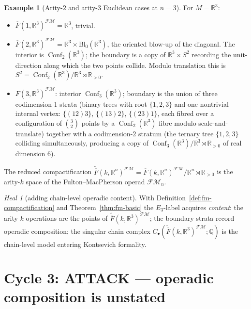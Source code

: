 \documentclass[11pt]{article}
\theoremstyle{definition}
\newtheorem{example}[theorem]{Example}
\theoremstyle{remark}
\newtheorem{heal}[theorem]{Heal}
\DeclareMathOperator{\Conf}{Conf}
\newcommand{\FMbar}{\overline{F}}
\newcommand{\FM}{\mathcal{FM}}
\begin{document}
\begin{example}[Arity-$2$ and arity-$3$ Euclidean cases at $n = 3$]
\label{ex:fm-arity-2-3}
For $M = \mathbb{R}^3$:
\begin{itemize}
 \item $\FMbar(1, \mathbb{R}^3)^{\FM} = \mathbb{R}^3$, trivial.
 \item $\FMbar(2, \mathbb{R}^3)^{\FM} = \mathbb{R}^3 \times
       \mathrm{Bl}_0(\mathbb{R}^3)$, the oriented blow-up of the
       diagonal. The interior is $\Conf_2(\mathbb{R}^3)$; the
       boundary is a copy of $\mathbb{R}^3 \times S^2$ recording the
       unit-direction along which the two points collide. Modulo
       translation this is $S^2 = \Conf_2(\mathbb{R}^3)/\mathbb{R}^3
       \rtimes \mathbb{R}_{>0}$.
 \item $\FMbar(3, \mathbb{R}^3)^{\FM}$: interior
       $\Conf_3(\mathbb{R}^3)$; boundary is the union of three
       codimension-$1$ strata (binary trees with root $\{1,2,3\}$ and
       one nontrivial internal vertex: $\{(12)3\}$, $\{(13)2\}$,
       $\{(23)1\}$, each fibred over a configuration of
       $\binom{3}{2}$ points by a $\Conf_2(\mathbb{R}^3)$ fibre modulo
       scale-and-translate) together with a codimension-$2$ stratum
       (the ternary tree $\{1, 2, 3\}$ colliding simultaneously,
       producing a copy of $\Conf_3(\mathbb{R}^3)/\mathbb{R}^3
       \rtimes \mathbb{R}_{>0}$ of real dimension $6$).
\end{itemize}
The reduced compactification
$\widetilde{\FMbar}(k, \mathbb{R}^n)^{\FM} = \FMbar(k, \mathbb{R}^n)^{\FM}/\mathbb{R}^n \rtimes \mathbb{R}_{>0}$
is the arity-$k$ space of the Fulton--MacPherson operad $\FM_n$.
\end{example}

\begin{heal}[adding chain-level operadic content]
\label{heal:cycle-2}
With Definition~\ref{def:fm-compactification} and
Theorem~\ref{thm:fm-basic} the $E_3$-label acquires \emph{content}:
the arity-$k$ operations are the points of
$\widetilde{\FMbar}(k, \mathbb{R}^3)^{\FM}$; the boundary strata record
operadic composition; the singular chain complex
$C_\bullet(\widetilde{\FMbar}(k, \mathbb{R}^3)^{\FM}; \mathbb{Q})$ is
the chain-level model entering Kontsevich formality.
\end{heal}

\section{Cycle 3: ATTACK --- operadic composition is unstated}
\end{document}
